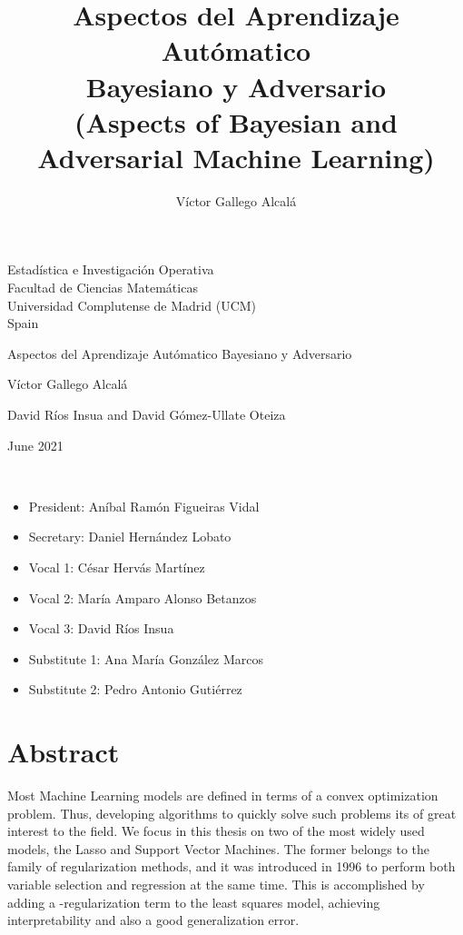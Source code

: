 \documentclass[a4paper, 11pt, openright, twoside]{reportPhD}
\title{Aspectos del Aprendizaje Autómatico \\ Bayesiano y Adversario \\
{\Large (Aspects of Bayesian and Adversarial Machine Learning) }}
\author{Víctor Gallego Alcalá}
\numberwithin{equation}{section}
\numberwithin{figure}{chapter}
\numberwithin{table}{chapter}
\begin{document}
\titulo

\cleardoublepage
\begin{description}[labelwidth=\widthof{\textbf{Department:}}, leftmargin=!, labelsep=2em]
\item[Department:] Estadística e Investigación Operativa \\ Facultad de Ciencias Matemáticas \\ Universidad Complutense de Madrid (UCM) \\ Spain
\item[Title:] Aspectos del Aprendizaje Autómatico Bayesiano y Adversario
\item[Author:] Víctor Gallego Alcalá
\item[Advisors:] David Ríos Insua and David Gómez-Ullate Oteiza
\item[Date:] June 2021
\item[Committee:] \mbox{} \\
\begin{itemize}[itemsep=1.8cm, labelsep=0.5em, leftmargin=-2em]
\item President: Aníbal Ramón Figueiras Vidal
\item Secretary: Daniel Hernández Lobato
\item Vocal 1: César Hervás Martínez
\item Vocal 2: María Amparo Alonso Betanzos
\item Vocal 3: David Ríos Insua
\item Substitute 1: Ana María González Marcos
\item Substitute 2: Pedro Antonio Gutiérrez
\end{itemize}
\end{description}


\chapter*{Abstract}
Most Machine Learning models are defined in terms of a convex optimization problem. Thus, developing algorithms to quickly solve such problems its of great interest to the field. We focus in this thesis on two of the most widely used models, the Lasso and Support Vector Machines. The former belongs to the family of regularization methods, and it was introduced in 1996 to perform both variable selection and regression at the same time. This is accomplished by adding a \lo-regularization term to the least squares model, achieving interpretability and also a good generalization error.
 
\end{document}
